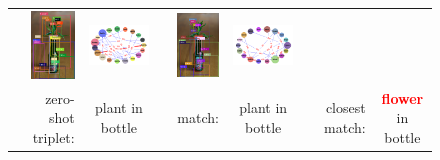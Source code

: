\begin{figure}
\begin{tabular}{p{0.3cm}|rc|p{0.1cm}rc|p{0.1cm}rc}
		& \includegraphics[width=\figwidthvis, height=1.8cm, align=c]{2315538_baseline_zs_baseline.png} &
		\includegraphics[width=\figwidthvis, align=c]{2315538_baseline_zs_graph_baseline.png} & 
		& \includegraphics[width=\figwidthvis, height=1.8cm, align=c]{2315538_baseline_zs_ours.png} &
		\includegraphics[width=\figwidthvis, align=c]{2315538_baseline_zs_graph_ours.png} \Tstrutmore\Bstrut\\
		& zero-shot triplet: & {plant in bottle} & & match: & plant in bottle & & closest match: & {\textcolor{red}{\textbf{flower}} in bottle}\Bstrut\\
		

\end{tabular}
\end{figure}
